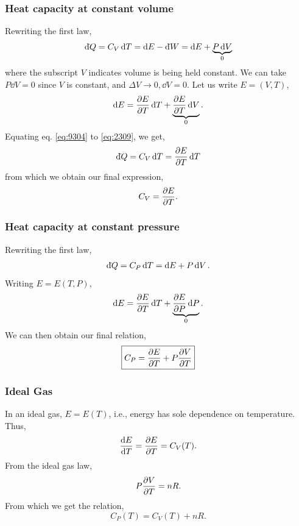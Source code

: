 \documentclass{book}
\newcommand{\dbar}{\mathrm{d}\hspace*{-0.08em}\bar{}\hspace*{0.1em}}
\begin{document}
\subsubsection{Heat capacity at constant volume}
Rewriting the first law,
\begin{equation}
	\dbar Q = C_V\dd{T} = \dd{E} - \dbar W = \dd{E} + \underbrace{P\dd{V}}_0 \label{eq:9304}
\end{equation}
where the subscript $V$ indicates volume is being held constant. We can take $P\dd{V}= 0$ since $V$ is constant, and $\Delta V \to 0, \dd{V} = 0$. Let us write $E = (V,T)$,
\begin{equation}
	\dd{E} = \pdv{E}{T}\dd{T} + \underbrace{\pdv{E}{T}\dd{V}}_0. \label{eq:2309}
\end{equation}
Equating eq. \eqref{eq:9304} to \eqref{eq:2309}, we get,
\begin{equation}
	\dbar{Q} = C_V\dd{T} = \pdv{E}{T}\dd{T}
\end{equation}
from which we obtain our final expression,
\begin{equation}
	C_V = \pdv{E}{T}.
\end{equation}
\subsubsection{Heat capacity at constant pressure}
Rewriting the first law,
\begin{equation}
	\dbar{Q} = C_P\dd{T} = \dd{E} + P\dd{V}.
\end{equation}
Writing $E = E(T, P)$,
\begin{equation}
	\dd{E} = \pdv{E}{T}\dd{T} + \underbrace{\pdv{E}{P}\dd{P}}_0.
\end{equation}
We can then obtain our final relation,
\begin{equation}
	\boxed{ C_P = \pdv{E}{T} + P\pdv{V}{T} }
\end{equation}
\subsubsection{Ideal Gas}
In an ideal gas, $E = E(T)$, i.e., energy has sole dependence on temperature. Thus,
\begin{equation}
	\dv{E}{T} = \pdv{E}{T} = C_V(T). \label{eq:20}
\end{equation}
From the ideal gas law,
\begin{equation}
	P\pdv{V}{T} = nR.
\end{equation}
From which we get the relation,
\begin{equation}
	\boxed{C_P(T) = C_V(T) + nR}.
\end{equation}
\end{document}
